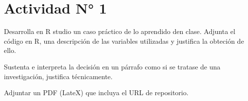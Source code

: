 \documentclass[a4paper,10pt]{article}
\begin{document}
\section*{Actividad N° 1}

\noindent Desarrolla en R studio un caso práctico de lo aprendido den clase. Adjunta el código en R, una descripción de las variables utilizadas y justifica la obteción de ello.

\noindent Sustenta e interpreta la decisión en un párrafo como si se tratase de una investigación, justifica técnicamente.

Adjuntar un PDF (LateX) que incluya el URL de repositorio.
\end{document}
